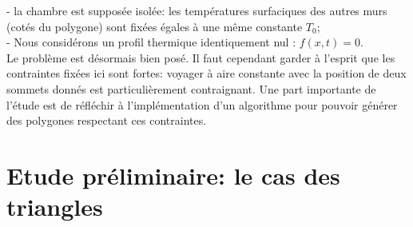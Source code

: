 \documentclass[a4paper,reqno]{article}
\begin{document}
- la chambre est supposée isolée: les températures surfaciques des autres murs (cotés du polygone) sont fixées égales à une même constante $T_{0}$; \\
- Nous considérons un profil thermique identiquement nul : $f(x,t)  = 0$.
\\
Le problème est désormais bien posé. Il faut cependant garder à l'esprit que les contraintes fixées ici sont fortes: voyager à aire constante avec la position de deux sommets donnés est particulièrement contraignant. Une part importante de l'étude est de réfléchir à l'implémentation d'un algorithme pour pouvoir générer des polygones respectant ces contraintes.




\part{Etude préliminaire: le cas des triangles}

\end{document}
